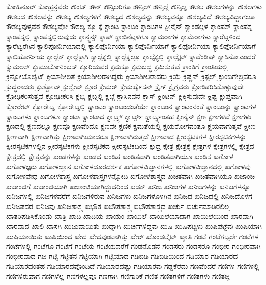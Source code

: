 {ಕೋಹಿನೂರ್
ಕೋಹ್ರನ್ರವರು
ಕೌಂಟ್
ಕೌನ್
ಕೌನ್ಸಿಲರಿಗೂ
ಕೌನ್ಸಿಲ್
ಕೌನ್ಸಿಲ್ಗೆ
ಕೌನ್ಸಿಲ್ನ
ಕೌಶಲ
ಕೌಶಲಗಳನ್ನು
ಕೌಶಲಗಳು
ಕೌಶಲದ
ಕೌಶಲವನ್ನು
ಕೌಶಲ್ಯ
ಕೌಶಲ್ಯಗಳಿಗೆ
ಕೌಶಲ್ಯದ
ಕೌಶಲ್ಯವನ್ನು
ಕೌಶಲ್ಯವನ್ನೂ
ಕೌಶಲ್ಯವಿದೆ
ಕೌಶಲ್ಯವಿದ್ದಾಗಲೂ
ಕೌಶಲ್ಯವುಳ್ಳವರ
ಕೌಶಲ್ಯವೋ
ಕೌಸಲ್ಯ
ಕ್ಕೂ
ಕ್ಕೆ
ಕ್ಟಾಂಟ
ಕ್ಟಾಂಟಂ
ಕ್ಟಾಂಟಗಳ
ಕ್ಪೀನೈನ್
ಕ್ಯಾಂಡಲ್ಗಳ
ಕ್ಯಾಂಪಸ್
ಕ್ಯಾಂಪಸ್ನ
ಕ್ಯಾಂಪಸ್ನಲ್ಲಿ
ಕ್ಯಾಂಪಸ್ನಲ್ಲಿರುವುದು
ಕ್ಯಾನ್ಸ್ಟನ್ಸ್
ಕ್ಯಾಪ್
ಕ್ಯಾಬಿನೆಟ್ಗಳಿಗೂ
ಕ್ಯಾಮರಾಗಳ
ಕ್ಯಾಮೆರಾಗಳು
ಕ್ಯಾರೆಟ್ಗಳಿಂದ
ಕ್ಯಾರೆಟ್ವರೆಗಿನ
ಕ್ಯಾಲಿಪೋರ್ನಿಯಾದಲ್ಲಿ
ಕ್ಯಾಲಿಫೊರ್ನಿಯಾ
ಕ್ಯಾಲಿಫೊರ್ನಿಯಾಗೆ
ಕ್ಯಾಲಿಫೋರ್ನಿಯಾ
ಕ್ಯಾಲಿಫೋರ್ನಿಯಾಗೆ
ಕ್ಯಾಲಿಹೋರ್ನಿಯ
ಕ್ಯಾಲ್ಟೆಕ್
ಕ್ಯಾಲ್ಟೆಕ್ಗಾಗಿ
ಕ್ಯಾಲ್ಟೆಕ್ನಲ್ಲಿ
ಕ್ಯಾಲ್ಟೆಕ್ನಲ್ಲೂ
ಕ್ಯಾಲ್ಟೆಕ್ಯಲ್ಲಿ
ಕ್ಯಾಲ್ಸೈಟ್
ಕ್ಯಾವೆಂಡಿಷ್
ಕ್ಯಾಸಿನೋಎಂದರೆ
ಕ್ಯುಮಲಸ್
ಕ್ಯುಮುಲೋನಿಂಬಸ್
ಕ್ಯೂರಿಯವರ
ಕ್ರಮಕ್ಕೂ
ಕ್ರಮಬದ್ಧ
ಕ್ರಮಿಸುತ್ತವೆ
ಕ್ರಾಂತಿಗೆ
ಕ್ರಾಂತಿಯಲ್ಲಿ
ಕ್ರಿನ್ನೋಬೊಲೈಟ್
ಕ್ರಿಯಾಶೀಲತೆ
ಕ್ರಿಯಾಶೀಲರಾಗಿದ್ದರು
ಕ್ರಿಯಾಶೀಲರಾದರು
ಕ್ರಿಯೆ
ಕ್ರಿಷ್ಣನ್
ಕ್ರಿಸ್ಟಲ್
ಕ್ರುಂಬಿಗೇಲ್ರವರೂ
ಕ್ರುದ್ಧರಾದರು
ಕ್ರುಶ್ಚೋವ್
ಕ್ರುಶ್ವೇವ್
ಕ್ರೂರ
ಕ್ರೇಮರ್
ಕ್ರೇಮರ್ಹೈಸನ್
ಕ್ರೈಗ್
ಕ್ರೈಗ್ರವರು
ಕ್ರೋಡಿಕರಿಸಿಕೊಳ್ಳುವುದೇ
ಕ್ರೋಢಿಕರಿಸುತ್ತವೆ
ಕ್ರೋಢೀಕರಿಸಿ
ಕ್ಲಬ್ನ
ಕ್ಲಬ್ನಲ್ಲಿ
ಕ್ಲಬ್ಗೆ
ಕ್ಲಾಸಿನವನೆ
ಕ್ಲಾಸ್
ಕ್ಲಿಂಟನ್
ಕ್ಲಿಕ್ಕಿಸುವುದೇ
ಕ್ಲಿಷ್ಟ
ಕ್ಲುಪ್ತವಾಗಿ
ಕ್ಲೋರೇಟ್
ಕ್ಲೋರೇಟ್ನ
ಕ್ಲೋರೇಟ್ನಲ್ಲಿ
ಕ್ವಾಂಟಂ
ಕ್ವಾಂಟಂದಂತೆಯೇ
ಕ್ವಾಂಟಂನ
ಕ್ವಾಂಟಂನಂತೆ
ಕ್ವಾಂಟಂನ್ನು
ಕ್ವಾಂಟಗಳ
ಕ್ವಾಂಟಗಳು
ಕ್ವಾಂಟಗಳೂ
ಕ್ವಾಂಟಾ
ಕ್ವಾಂಟಾದ
ಕ್ವಾಟ್ರ್ಸ್
ಕ್ವಾರ್ಟ್ಸ್
ಕ್ವಾರ್ಟ್ಸ್ನಂತಹ
ಕ್ವೀನೈನ್
ಕ್ಷಣ
ಕ್ಷಣಗಳಿವೆ
ಕ್ಷಣಗಳು
ಕ್ಷಣದಲ್ಲಿ
ಕ್ಷಣದಲ್ಲೂ
ಕ್ಷಣವೂ
ಕ್ಷಣವೆಂದೂ
ಕ್ಷಣವೇ
ಕ್ಷಣಿಕ
ಕ್ಷಮತೆಯಲ್ಲಿ
ಕ್ಷಯರೋಗವಂತೂ
ಕ್ಷಯವಾಗುತ್ತವೆ
ಕ್ಷೀಣ
ಕ್ಷೀಣವಾಗಿ
ಕ್ಷೀಣವಾಗಿತ್ತು
ಕ್ಷೀಣವಾಗಿಯಾದರೂ
ಕ್ಷೀಣವಾಗಿರುತ್ತದೆ
ಕ್ಷೀಣವಾದ
ಕ್ಷೀರಸ್ಫಟಿಕಗಳ
ಕ್ಷೀರಸ್ಫಟಿಕಗಳನ್ನು
ಕ್ಷೀರಸ್ಫಟಿಕಗಳಲ್ಲಿನ
ಕ್ಷೀರಸ್ಫಟಿಕಗಳು
ಕ್ಷೀರಸ್ಫಟಿಕದ
ಕ್ಷೀರಸ್ಫಟಿಕದಿಂದ
ಕ್ಷುದ್ರ
ಕ್ಷೇತ್ರ
ಕ್ಷೇತ್ರಕ್ಕೆ
ಕ್ಷೇತ್ರಗಳ
ಕ್ಷೇತ್ರಗಳಲ್ಲಿ
ಕ್ಷೇತ್ರದ
ಕ್ಷೇತ್ರದಲ್ಲಿ
ಕ್ಷೇತ್ರವನ್ನು
ಖಂಡಗಳನ್ನು
ಖಂಡದ
ಖಂಡಿತ
ಖಂಡಿತವಾಗಿ
ಖಂಡಿತವಾಗಿಯೂ
ಖಂಡಿಸ
ಖಗೋಳ
ಖಗೋಳಜ್ಞರು
ಖಗೋಳಜ್ಞಾನ
ಖಗೋಳದೂರದರ್ಶಕ
ಖಗೋಳವಿಜ್ಞಾನಗಳಲ್ಲಿ
ಖಗೋಳವಿಜ್ಞಾನದಲ್ಲಿ
ಖಗೋಳವು
ಖಗೋಳವೇಧ
ಖಗೋಳಶಾಸ್ತ್ರ
ಖಗೋಳಶಾಸ್ತ್ರಗಳನ್ನೋದಿ
ಖಗೋಳಶಾಸ್ತ್ರದ
ಖಚಿತವಾಗಿ
ಖಚಿತವಾಗಿಯೂ
ಖಜಾಂಚಿ
ಖಜಾಂಚಿಗೆ
ಖಜಾಂಚಿಯಾಗಿ
ಖಜಾಂಚಿಯಾಗಿದ್ದುದರಿಂದ
ಖಡಕ್
ಖನಿಜ
ಖನಿಜಗಳ
ಖನಿಜಗಳನ್ನು
ಖನಿಜಗಳನ್ನೂ
ಖನಿಜಗಳಲ್ಲಿ
ಖನಿಜಗಳವರೆಗೆ
ಖನಿಜಗಳಿರುವ
ಖನಿಜಗಳು
ಖನಿಜಗಳೊಳಗಿನ
ಖನಿಜದ
ಖನಿಜದಲ್ಲಿ
ಖನಿಜದೊಳಗೆ
ಖನಿಜಪದರ
ಖನಿಜವು
ಖನಿಜಶಾಸ್ತ್ರ
ಖಭೌತ
ಖಭೌತಶಾಸ್ತ್ರ
ಖಭೌತಶಾಸ್ತ್ರದ
ಖರ್ಚು
ಖರ್ಚುಮಾಡಿರಲಿಲ್ಲ
ಖಾತರಿಪಡಿಸಿಕೊಂಡು
ಖಾತ್ರಿ
ಖಾದಿ
ಖಾದಿಯ
ಖಾಯಂ
ಖಾಯಿಲೆ
ಖಾಯಿಲೆಯಾದಾಗ
ಖಾಯಿಲೆಯಿಂದ
ಖಾರವಾಗಿ
ಖಾರವಾದ
ಖಾಲಿ
ಖಾಸಗಿ
ಖುಜುವಾಯಿತು
ಖುದ್ದಾಗಿ
ಖುರ್ಚಿಗಳಿದ್ದವು
ಖುಷಿ
ಖುಷಿಪಟ್ಟಳು
ಖುಷಿಪಟ್ಟೆವು
ಖುಷಿಯಾಗಿ
ಖುಷಿಯಾಯಿತು
ಖುಷಿಯಿಂದ
ಖೇದ
ಖೇದವುಂಟಾಗಿತ್ತು
ಖೇರ್
ಖೊಂಡಲೈಟ್
ಖ್ಯಾತಿ
ಗಂಟೆ
ಗಂಟೆಗಟ್ಟಲೇ
ಗಂಟೆಗಳ
ಗಂಟೆಗಳಲ್ಲಿ
ಗಂಟೆಗೂ
ಗಂಟೆಗೆ
ಗಂಟೆಯ
ಗಂಟೆಯವರೆಗೆ
ಗಂಡನೊಡನೆ
ಗಂಡಸರು
ಗಂಡಸರೂ
ಗಂಭೀರ
ಗಂಭೀರವಾಗಿ
ಗಂಭೀರವಾದ
ಗಜ
ಗಟ್ಟಿ
ಗಟ್ಟಿತನ
ಗಟ್ಟಿಯಾಗಿ
ಗಟ್ಟಿಯಾದ
ಗಡಿಬಿಡಿ
ಗಡಿಬಿಡಿಯಿಂದ
ಗಡಿಯಾರ
ಗಡಿಯಾರದ
ಗಡಿಯಾರದಂತಹ
ಗಡಿಯಾರದವೊಂದಿದೆ
ಗಡಿಯಾರದಷ್ಟು
ಗಡಿಯಾರವು
ಗಡ್ಡಕೆರೆದು
ಗಣವೆಂದರೆ
ಗಣಿಗಳ
ಗಣಿಗಳಲ್ಲಿ
ಗಣಿಗಳಿರುವಾಗ
ಗಣಿಗಳೆಲ್ಲ
ಗಣಿಗಳೆಲ್ಲವೂ
ಗಣಿಗಾಗಿ
ಗಣಿಗಾರಿಕೆ
ಗಣಿತ
ಗಣಿತಗಳಿಗೆ
ಗಣಿತಗಳು
ಗಣಿತಜ್ಞ
}

